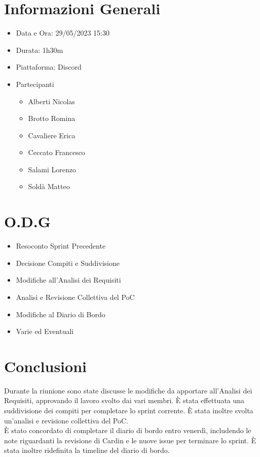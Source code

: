 \documentclass[a4paper, 12pt]{article}
\begin{document}
\makefrontpage

\section*{Informazioni Generali}
\begin{itemize}
    \item Data e Ora: 29/05/2023 15:30
    \item Durata: 1h30m
    \item Piattaforma: Discord
    \item Partecipanti
    \begin{itemize}
        \item Alberti Nicolas
        \item Brotto Romina
        \item Cavaliere Erica
        \item Ceccato Francesco
        \item Salami Lorenzo
        \item Soldà Matteo
    \end{itemize}
\end{itemize}

\section*{O.D.G}
\begin{itemize}
    \item Resoconto Sprint Precedente
    \item Decisione Compiti e Suddivisione
    \item Modifiche all'Analisi dei Requisiti
    \item Analisi e Revisione Collettiva del PoC
    \item Modifiche al Diario di Bordo
    \item Varie ed Eventuali
\end{itemize}

\section*{Conclusioni}
Durante la riunione sono state discusse le modifiche da apportare all'Analisi dei Requisiti, approvando il lavoro svolto dai vari membri. È stata effettuata una suddivisione dei compiti per completare lo sprint corrente. È stata inoltre svolta un'analisi e revisione collettiva del PoC.\\
È stato concordato di completare il diario di bordo entro venerdì, includendo le note riguardanti la revisione di Cardin e le nuove issue per terminare lo sprint. È stata inoltre ridefinita la timeline del diario di bordo.
\end{document}
